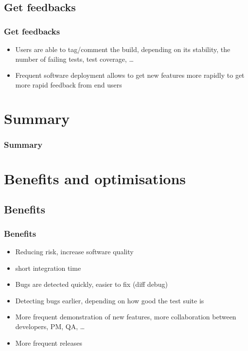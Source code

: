 \documentclass{beamer}
\begin{document}
\subsection[Get feedbacks]{Get feedbacks}
\begin{frame}
\frametitle{Get feedbacks}

\begin{itemize}
  \item Users are able to tag/comment the build, depending on its stability,
  the number of failing tests, test coverage, \ldots
  \item Frequent software deployment allows to get new features more rapidly to
  get more rapid feedback\cite{Fowler06} from end users
\end{itemize}

\end{frame}


\section*{Summary}
\begin{frame}
\frametitle<presentation>{Summary}

\centering
{}

\end{frame}

\section[Benefits and optimisations]{Benefits and optimisations}
\subsection[Benefits]{Benefits}
\begin{frame}
\frametitle{Benefits}
\begin{itemize}
	\item<1-> Reducing risk, increase software quality 
    \item<2-> short integration time 
    \item<3-> Bugs are detected quickly, easier to fix (diff debug)
    \item<4-> Detecting bugs earlier, depending on how good the test suite is
    \item<5-> More frequent demonstration of new features, more collaboration
    between developers, PM, QA, \ldots
    \item<6> More frequent releases
\end{itemize}
\end{frame}
\end{document}
